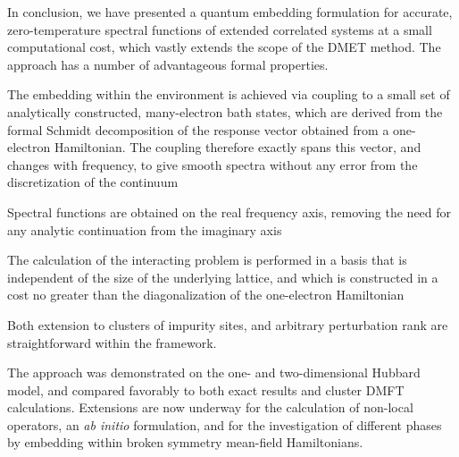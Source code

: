 \documentclass[aps,showpacs,twocolumn,nobibnotes]{revtex4}
\begin{document}
In conclusion, we have presented a quantum embedding formulation for accurate, zero-temperature spectral functions of extended correlated systems at a small computational cost, which vastly 
extends the scope of the DMET method. The approach has a number of 
advantageous formal properties. 
\begin{inparaenum}
\item The embedding within the environment is achieved via coupling to a small set of analytically constructed, many-electron bath states,
    which are derived from the formal Schmidt decomposition of the response vector obtained from a one-electron Hamiltonian. The coupling therefore exactly spans this vector, and
    changes with frequency, to give smooth spectra without any error from the discretization of the continuum
\item Spectral functions are obtained on the real frequency axis, removing the need for any analytic continuation from the imaginary axis
\item The calculation of the interacting problem is performed in a basis that is independent of the size of the underlying lattice, and which is constructed in a cost no greater than the
    diagonalization of the one-electron Hamiltonian
\item Both extension to clusters of impurity sites, and arbitrary perturbation rank are straightforward within the framework.
\end{inparaenum}
The approach was demonstrated on the one- and two-dimensional Hubbard model, and compared favorably to both exact results and cluster DMFT calculations. Extensions are now underway for the
calculation of non-local operators, an {\em ab initio} formulation, and for the investigation of different phases by embedding within broken symmetry mean-field Hamiltonians.


\end{document}
